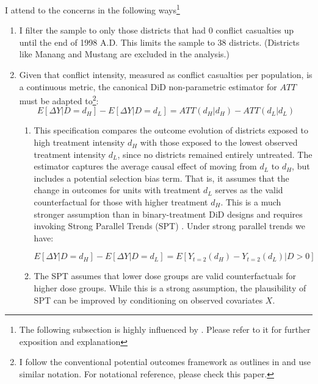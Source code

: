 \documentclass[12pt,a4paper]{article}
\begin{document}
I attend to the concerns in the following ways\footnote{The following subsection is highly influenced by \parencite{callaway2024difference}. Please refer to it for further exposition and explanation}



\begin{enumerate}
	\item I filter the sample to only those districts that had 0 conflict casualties up until the end of 1998 A.D. This limits the sample to 38 districts. (Districts like Manang and Mustang are excluded in the analysis.)
	
	\item Given that conflict intensity, measured as conflict casualties per population, is a continuous metric, the canonical DiD non-parametric estimator for $ATT$ must be adapted to\footnote{I follow the conventional potential outcomes framework as outlines in \parencite{baker2025difference} and use similar notation. For notational reference, please check this paper.}:
	\begin{equation}
		E[\Delta Y|D=d_{H}]-E[\Delta Y|D=d_{L}]=ATT(d_{H}|d_{H})-ATT(d_{L}|d_{L})
	\end{equation}
	\begin{enumerate}
		\item This specification compares the outcome evolution of districts exposed to high treatment intensity $d_H$ with those exposed to the lowest observed treatment intensity $d_L$, since no districts remained entirely untreated. The estimator captures the average causal effect of moving from $d_L$ to $d_H$, but includes a potential selection bias term. That is, it assumes that the change in outcomes for units with treatment $d_L$ serves as the valid counterfactual for those with higher treatment $d_H$. This is a much stronger assumption than in binary-treatment DiD designs and requires invoking Strong Parallel Trends (SPT) \parencite{callaway2024difference}. Under strong parallel trends we have:
		
		\begin{equation}
			E[\Delta Y|D=d_{H}]-E[\Delta Y|D=d_{L}]=E[Y_{t=2}(d_{H})-Y_{t=2}(d_{L})|D>0]
		\end{equation}
		
		\item The SPT assumes that lower dose groups are valid counterfactuals for higher dose groups. While this is a strong assumption, the plausibility of SPT can be improved by conditioning on observed covariates $X$.
	\end{enumerate}
	

\end{enumerate}
\end{document}
